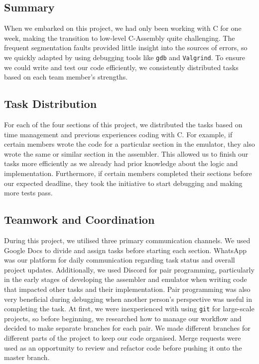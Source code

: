 \documentclass[11pt]{article}
\begin{document}
\subsection{Summary}

When we embarked on this project, we had only been working with C for one week, making the transition to low-level C-Assembly quite challenging. The frequent segmentation faults provided little insight into the sources of errors, so we quickly adapted by using debugging tools like \texttt{gdb} and \texttt{Valgrind}. To ensure we could write and test our code efficiently, we consistently distributed tasks based on each team member's strengths.

\subsection{Task Distribution}

For each of the four sections of this project, we distributed the tasks based on time management and previous experiences coding with C. For example, if certain members wrote the code for a particular section in the emulator, they also wrote the same or similar section in the assembler. This allowed us to finish our tasks more efficiently as we already had prior knowledge about the logic and implementation. Furthermore, if certain members completed their sections before our expected deadline, they took the initiative to start debugging and making more tests pass.

\subsection{Teamwork and Coordination}

During this project, we utilised three primary communication channels. We used Google Docs to divide and assign tasks before starting each section. WhatsApp was our platform for daily communication regarding task status and overall project updates. Additionally, we used Discord for pair programming, particularly in the early stages of developing the assembler and emulator when writing code that impacted other tasks and their implementation. Pair programming was also very beneficial during debugging when another person’s perspective was useful in completing the task. At first, we were inexperienced with using \texttt{git} for large-scale projects, so before beginning, we researched how to manage our workflow and decided to make separate branches for each pair. We made different branches for different parts of the project to keep our code organised. Merge requests were used as an opportunity to review and refactor code before pushing it onto the master branch.
\end{document}
